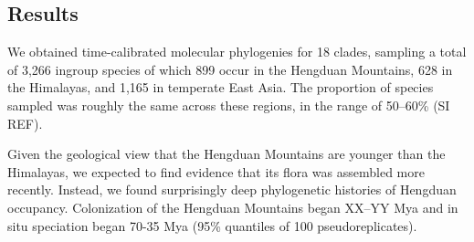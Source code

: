 \subsection{Results}

We obtained time-calibrated molecular phylogenies for 18 clades, sampling a total of 3,266 ingroup species of which 899 occur in the Hengduan Mountains, 628 in the Himalayas, and 1,165 in temperate East Asia. The proportion of species sampled was roughly the same across these regions, in the range of 50--60\% (SI REF).

Given the geological view that the Hengduan Mountains are younger than the Himalayas, we expected to find evidence that its flora was assembled more recently. Instead, we found surprisingly deep phylogenetic histories of Hengduan occupancy. Colonization of the Hengduan Mountains began XX--YY Mya and in situ speciation began 70-35 Mya (95\% quantiles of 100 pseudoreplicates).